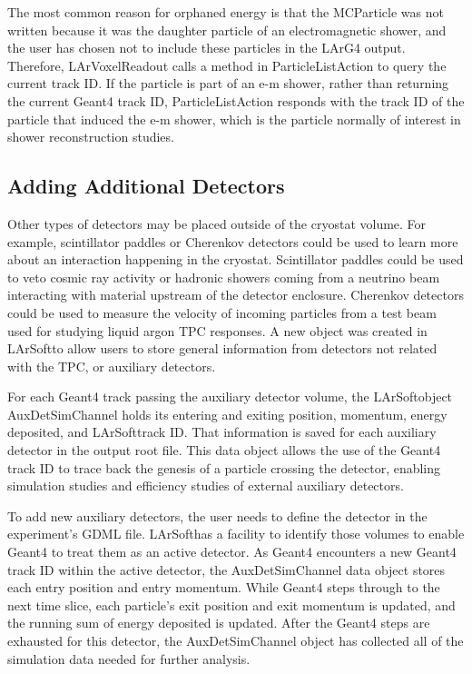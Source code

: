 \documentclass[12pt]{elsarticle}
\newcommand{\larsoft}{LArSoft}
\begin{document}
The most common reason for orphaned energy is that the MCParticle
was not written because it was the daughter
particle of an electromagnetic shower, and the user has chosen not to
include these particles in the LArG4 output. Therefore, LArVoxelReadout calls a method in ParticleListAction to query the current track ID. If the
particle is part of an e-m shower, rather than returning the current
Geant4 track ID, ParticleListAction responds with the
track ID of the particle that induced the e-m shower, which is the
particle normally of interest in shower reconstruction studies.

\subsection{Adding Additional Detectors}
Other types of detectors may be placed outside of the cryostat volume.
For example, scintillator paddles or Cherenkov detectors could be used to learn more about an interaction happening in the cryostat.
Scintillator paddles could be used to veto cosmic ray activity or hadronic showers coming from a neutrino beam interacting with material upstream of the detector enclosure.
Cherenkov detectors could be used to measure the velocity of incoming particles from a test beam used for studying liquid argon TPC responses.
A new object was created in \larsoft to allow users to store general information from detectors not related with the TPC, or auxiliary detectors.

For each Geant4 track passing the auxiliary detector volume, the \larsoft object AuxDetSimChannel holds its entering and exiting position, momentum, energy deposited, and \larsoft track ID.
That information is saved for each auxiliary detector in the output root file.
This data object allows the use of the Geant4 track ID to trace back the genesis of a particle crossing the detector, enabling simulation studies and efficiency studies of external auxiliary detectors.

To add new auxiliary detectors, the user needs to define the detector in the experiment's GDML file.
\larsoft has a facility to identify those volumes to enable Geant4 to treat them as an active detector.
As Geant4 encounters a new Geant4 track ID within the active detector, the AuxDetSimChannel data object stores each entry position and entry momentum.
While Geant4 steps through to the next time slice, each particle's exit position and exit momentum is updated, and the running sum of energy deposited is updated. 
After the Geant4 steps are exhausted for this detector, the AuxDetSimChannel object has collected all of the simulation data needed for further analysis.
\end{document}
